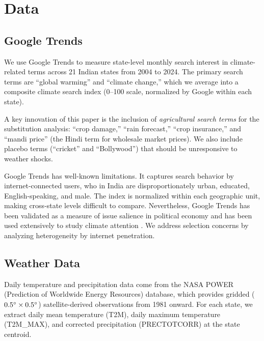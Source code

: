 \documentclass[12pt]{article}
\begin{document}
\section{Data}
\label{sec:data}

\subsection{Google Trends}

We use Google Trends to measure state-level monthly search interest in climate-related terms across 21 Indian states from 2004 to 2024. The primary search terms are ``global warming'' and ``climate change,'' which we average into a composite climate search index (0--100 scale, normalized by Google within each state).

A key innovation of this paper is the inclusion of \textit{agricultural search terms} for the substitution analysis: ``crop damage,'' ``rain forecast,'' ``crop insurance,'' and ``mandi price'' (the Hindi term for wholesale market prices). We also include placebo terms (``cricket'' and ``Bollywood'') that should be unresponsive to weather shocks.

Google Trends has well-known limitations. It captures search behavior by internet-connected users, who in India are disproportionately urban, educated, English-speaking, and male. The index is normalized within each geographic unit, making cross-state levels difficult to compare. Nevertheless, Google Trends has been validated as a measure of issue salience in political economy \citep{stephensetal2014} and has been used extensively to study climate attention \citep{herrnstadt2014, howe2015geographic}. We address selection concerns by analyzing heterogeneity by internet penetration.

\subsection{Weather Data}

Daily temperature and precipitation data come from the NASA POWER (Prediction of Worldwide Energy Resources) database, which provides gridded ($0.5\degree \times 0.5\degree$) satellite-derived observations from 1981 onward. For each state, we extract daily mean temperature (T2M), daily maximum temperature (T2M\_MAX), and corrected precipitation (PRECTOTCORR) at the state centroid.
\end{document}
